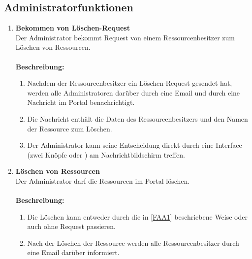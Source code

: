 \documentclass[parskip=full,11pt]{scrartcl}
\def\threedigits#1{%
  \ifnum#1<10 0\fi
  \ifnum#1<1 0\fi
  \number#1}
\begin{document}
\subsection{Administratorfunktionen}
\begin{enumerate}[label={\textbf{/F\protect\threedigits{\theenumi}0/}}, leftmargin=*, resume]
\item \label{FAA1}\textbf{Bekommen von Löschen-Request}\\ Der Administrator bekommt Request von einem Ressourcenbesitzer zum Löschen von Ressourcen.\\\\
\textbf{Beschreibung:}\\
\begin{enumerate}[label=(\arabic*), leftmargin=*]
\item Nachdem der Ressourcenbesitzer ein Löschen-Request gesendet hat, werden alle Administratoren darüber durch eine Email und durch eine Nachricht im Portal benachrichtigt.\\
\item Die Nachricht enthält die Daten des Ressourcenbesitzers und den Namen der Ressource zum Löschen.\\ 
\item Der Administrator kann seine Entscheidung direkt durch eine Interface (zwei Knöpfe \grqq  \: oder \grqq  \:) am Nachrichtbildschirm treffen.
 
\end{enumerate}


\item \label{FAA2} \textbf{Löschen von Ressourcen}\\ Der Administrator darf die Ressourcen im Portal löschen.\\\\
\textbf{Beschreibung:}\\
\begin{enumerate}[label=(\arabic*), leftmargin=*]
\item Die Löschen kann entweder durch die in \ref{FAA1} beschriebene Weise oder auch ohne Request passieren.\\
\item Nach der Löschen der Ressource werden alle Ressourcenbesitzer durch eine Email darüber informiert. \\ 
\end{enumerate}



\end{enumerate}
\end{document}
